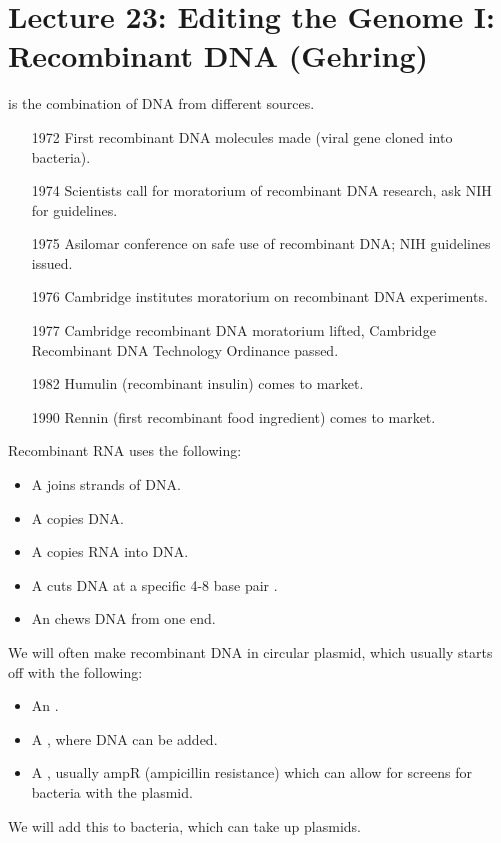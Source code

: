 \section*{Lecture 23: Editing the Genome I: Recombinant DNA (Gehring)}
\setcounter{section}{23}

\begin{defn}
	 is the combination of DNA from different sources.
\end{defn}

\begin{fact}
	\begin{itemize}
		\item[1972] First recombinant DNA molecules made (viral gene cloned into bacteria).
		\item[1974] Scientists call for moratorium of recombinant DNA research, ask NIH for guidelines.
		\item[1975] Asilomar conference on safe use of recombinant DNA; NIH guidelines issued.
		\item[1976] Cambridge institutes moratorium on recombinant DNA experiments.
		\item[1977] Cambridge recombinant DNA moratorium lifted, Cambridge Recombinant DNA Technology Ordinance passed.
		\item[1982] Humulin (recombinant insulin) comes to market.
		\item[1990] Rennin (first recombinant food ingredient) comes to market.
	\end{itemize}
\end{fact}

\begin{defn}
	Recombinant RNA uses the following:
	\begin{itemize}
		\item A  joins strands of DNA.
		\item A  copies DNA.
		\item A  copies RNA into DNA.
		\item A  cuts DNA at a specific 4-8 base pair .
		\item An  chews DNA from one end.
	\end{itemize}
\end{defn}

\begin{defn}
	We will often make recombinant DNA in circular plasmid, which usually starts off with the following:
	\begin{itemize}
		\item An .
		\item A , where DNA can be added.
		\item A , usually ampR (ampicillin resistance) which can allow for screens for bacteria with the plasmid.
	\end{itemize}
	We will add this to  bacteria, which can take up plasmids.
\end{defn}

